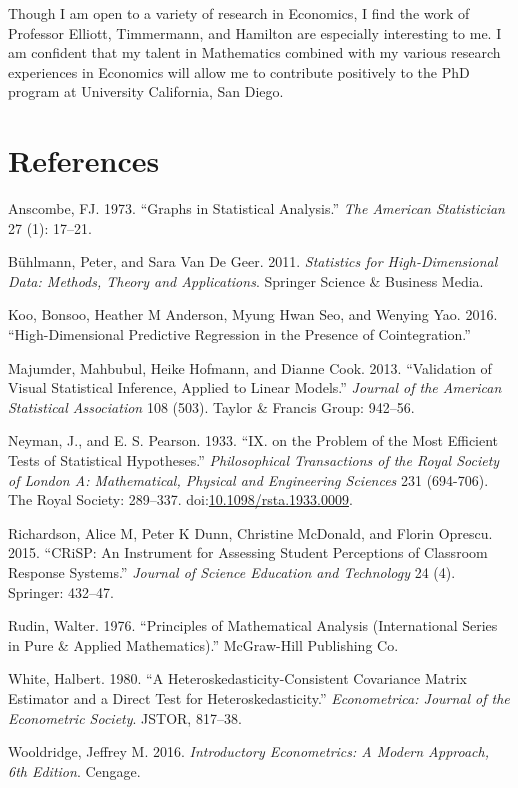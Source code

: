 \documentclass[12pt,]{article}
\begin{document}
Though I am open to a variety of research in Economics, I find the work
of Professor Elliott, Timmermann, and Hamilton are especially
interesting to me. I am confident that my talent in Mathematics combined
with my various research experiences in Economics will allow me to
contribute positively to the PhD program at University California, San
Diego.

\section*{References}\label{references}

\hypertarget{refs}{}
\hypertarget{ref-ANS73}{}
Anscombe, FJ. 1973. ``Graphs in Statistical Analysis.'' \emph{The
American Statistician} 27 (1): 17--21.

\hypertarget{ref-buhlmann}{}
Bühlmann, Peter, and Sara Van De Geer. 2011. \emph{Statistics for
High-Dimensional Data: Methods, Theory and Applications}. Springer
Science \& Business Media.

\hypertarget{ref-koo}{}
Koo, Bonsoo, Heather M Anderson, Myung Hwan Seo, and Wenying Yao. 2016.
``High-Dimensional Predictive Regression in the Presence of
Cointegration.''

\hypertarget{ref-MM13}{}
Majumder, Mahbubul, Heike Hofmann, and Dianne Cook. 2013. ``Validation
of Visual Statistical Inference, Applied to Linear Models.''
\emph{Journal of the American Statistical Association} 108 (503). Taylor
\& Francis Group: 942--56.

\hypertarget{ref-Neyman289}{}
Neyman, J., and E. S. Pearson. 1933. ``IX. on the Problem of the Most
Efficient Tests of Statistical Hypotheses.'' \emph{Philosophical
Transactions of the Royal Society of London A: Mathematical, Physical
and Engineering Sciences} 231 (694-706). The Royal Society: 289--337.
doi:\href{https://doi.org/10.1098/rsta.1933.0009}{10.1098/rsta.1933.0009}.

\hypertarget{ref-crisp}{}
Richardson, Alice M, Peter K Dunn, Christine McDonald, and Florin
Oprescu. 2015. ``CRiSP: An Instrument for Assessing Student Perceptions
of Classroom Response Systems.'' \emph{Journal of Science Education and
Technology} 24 (4). Springer: 432--47.

\hypertarget{ref-rudin}{}
Rudin, Walter. 1976. ``Principles of Mathematical Analysis
(International Series in Pure \& Applied Mathematics).'' McGraw-Hill
Publishing Co.

\hypertarget{ref-white}{}
White, Halbert. 1980. ``A Heteroskedasticity-Consistent Covariance
Matrix Estimator and a Direct Test for Heteroskedasticity.''
\emph{Econometrica: Journal of the Econometric Society}. JSTOR, 817--38.

\hypertarget{ref-wooldridge2016}{}
Wooldridge, Jeffrey M. 2016. \emph{Introductory Econometrics: A Modern
Approach, 6th Edition}. Cengage.
\end{document}

